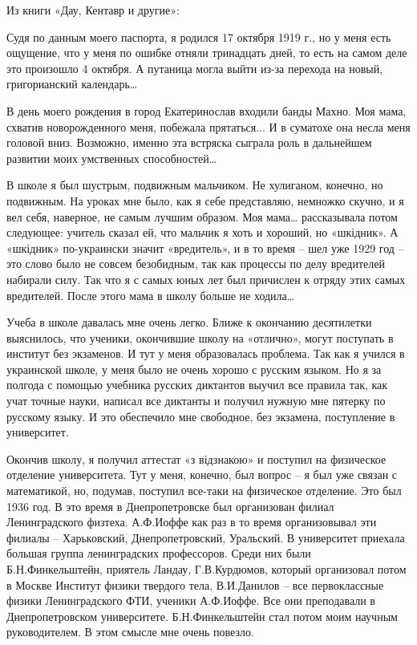 Из книги «Дау, Кентавр и другие»:

Судя по данным моего паспорта, я родился 17 октября 1919 г., но у меня есть
ощущение, что у меня по ошибке отняли тринадцать дней, то есть на самом деле
это произошло 4 октября. А путаница могла выйти из-за перехода на новый,
григорианский календарь… 

В день моего рождения в город Екатеринослав входили банды Махно. Моя мама,
схватив новорожденного меня, побежала прятаться... И в суматохе она несла меня
головой вниз. Возможно, именно эта встряска сыграла роль в дальнейшем развитии
моих умственных способностей…

В школе я был шустрым, подвижным мальчиком. Не хулиганом, конечно, но
подвижным. На уроках мне было, как я себе представляю, немножко скучно, и я вел
себя, наверное, не самым лучшим образом. Моя мама… рассказывала потом
следующее: учитель сказал ей, что мальчик я хоть и хороший, но «шкідник». А
«шкідник» по-украински значит «вредитель», и в то время – шел уже 1929 год –
это слово было не совсем безобидным, так как процессы по делу вредителей
набирали силу. Так что я с самых юных лет был причислен к отряду этих самых
вредителей. После этого мама в школу больше не ходила…

Учеба в школе давалась мне очень легко. Ближе к окончанию десятилетки
выяснилось, что ученики, окончившие школу на «отлично», могут поступать в
институт без экзаменов. И тут у меня образовалась проблема. Так как я учился в
украинской школе, у меня было не очень хорошо с русским языком. Но я за полгода
с помощью учебника русских диктантов выучил все правила так, как учат точные
науки, написал все диктанты и получил нужную мне пятерку по русскому языку. И
это обеспечило мне свободное, без экзамена, поступление в университет.

Окончив школу, я получил аттестат «з відзнакою» и поступил на физическое
отделение университета. Тут у меня, конечно, был вопрос – я был уже связан с
математикой, но, подумав, поступил все-таки на физическое отделение. Это был
1936 год. В это время в Днепропетровске был организован филиал Ленинградского
физтеха. А.Ф.Иоффе как раз в то время организовывал эти филиалы – Харьковский,
Днепропетровский, Уральский. В университет приехала большая группа
ленинградских профессоров. Среди них были Б.Н.Финкельштейн, приятель Ландау,
Г.В.Курдюмов, который организовал потом в Москве Институт физики твердого тела,
В.И.Данилов – все первоклассные физики Ленинградского ФТИ, ученики А.Ф.Иоффе.
Все они преподавали в Днепропетровском университете. Б.Н.Финкельштейн стал
потом моим научным руководителем. В этом смысле мне очень повезло.

